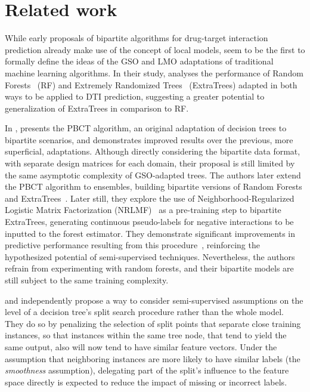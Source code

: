 
\section{Related work}
\label{sec:related_work}

While early proposals of bipartite algorithms for drug-target interaction prediction already make use of the concept of local models, \cite{schrynemackers2015classifying} seem to be the first to formally define the ideas of the GSO and LMO adaptations of traditional machine learning algorithms. In their study, \cite{schrynemackers2015classifying} analyses the performance of Random Forests~\citep{breiman2001random} (RF) and Extremely Randomized Trees~\citep{geurts2006extremely} (ExtraTrees) adapted in both ways to be applied to DTI prediction, suggesting a greater potential to generalization of ExtraTrees in comparison to RF.

In \citeyear{pliakos2018global}, \cite{pliakos2018global} presents the PBCT algorithm, an original adaptation of decision trees to bipartite scenarios, and demonstrates improved results over the previous, more superficial, adaptations. Although directly considering the bipartite data format, with separate design matrices for each domain, their proposal is still limited by the same asymptotic complexity of GSO-adapted trees.
The authors later extend the PBCT algorithm to ensembles, building bipartite versions of Random Forests and ExtraTrees~\cite{pliakos2019network}. Later still, they explore the use of Neighborhood-Regularized Logistic Matrix Factorization (NRLMF)~\citep{liu2016neighborhood} as a pre-training step to bipartite ExtraTrees, generating continuous pseudo-labels for negative interactions to be inputted to the forest estimator. They demonstrate significant improvements in predictive performance resulting from this procedure~\cite{pliakos2019network}, reinforcing the hypothesized potential of semi-supervised techniques. Nevertheless, the authors refrain from experimenting with random forests, and their bipartite models are still subject to the same training complexity.

\cite{levatic2017semisupervised} and {} independently propose a way to consider semi-supervised assumptions on the level of a decision tree's split search procedure rather than the whole model. They do so by penalizing the selection of split points that separate close training instances, so that instances within the same tree node, that tend to yield the same output, also will now tend to have similar feature vectors. Under the assumption that neighboring instances are more likely to have similar labels (the \emph{smoothness} assumption), delegating part of the split's influence to the feature space directly is expected to reduce the impact of missing or incorrect labels. 

